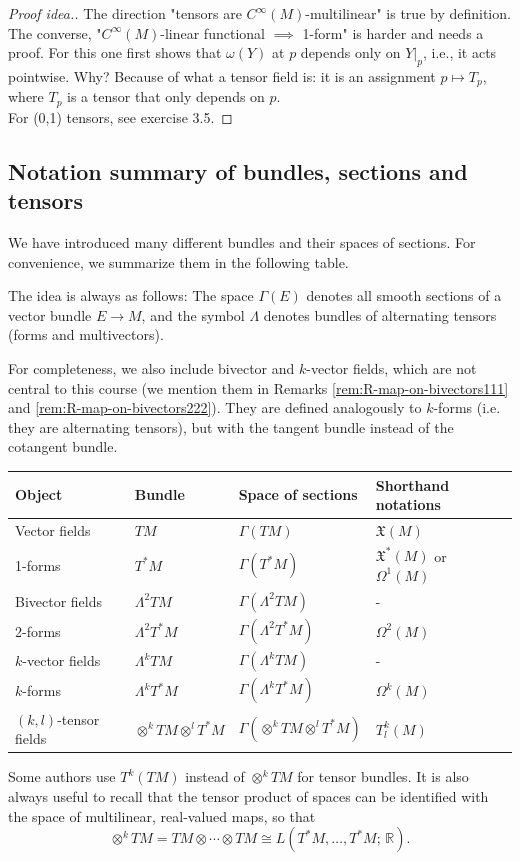 \begin{proof}[Proof idea.]
The direction "tensors are $C^\infty(M)$-multilinear" is true by definition. The converse, "$C^\infty(M)$-linear functional $\implies$ 1-form" is harder and needs a proof. For this one first shows that $\omega(Y)$ at $p$ depends only on $Y|_p$, i.e., it acts pointwise. Why? Because of what a tensor field is: it is an assignment $p\mapsto T_p$, where $T_p$ is a tensor that only depends on $p$.\\

For (0,1) tensors, see exercise 3.5.
\end{proof}



\subsection{Notation summary of bundles, sections and tensors}
\label{sec:notation-tensors}
We have introduced many different bundles and their spaces of sections. For convenience, we summarize them in the following table.

The idea is always as follows: The space $\Gamma(E)$ denotes all smooth sections of a vector bundle $E \to M$, and the symbol $\Lambda$ denotes bundles of alternating tensors (forms and multivectors). 

For completeness, we also include bivector and $k$-vector fields, which are not central to this course (we mention them in Remarks \ref{rem:R-map-on-bivectors111} and \ref{rem:R-map-on-bivectors222}). They are defined analogously to $k$-forms (i.e. they are alternating tensors), but with the tangent bundle instead of the cotangent bundle.\\

\begin{center}
\begin{tabular}{llll}
Object & Bundle & Space of sections & Shorthand notations\\
\hline
Vector fields & $TM$ & $\Gamma(TM)$ & $\mathfrak{X}(M)$ \\
1-forms & $T^*M$ & $\Gamma(T^*M)$ & $\mathfrak{X}^*(M)$ or $\Omega^1(M)$ \\
Bivector fields & $\Lambda^2 TM$ & $\Gamma(\Lambda^2 TM)$ & -\\
2-forms & $\Lambda^2 T^*M$ & $\Gamma(\Lambda^2 T^*M)$ & $\Omega^2(M)$ \\
$k$-vector fields & $\Lambda^k TM$ & $\Gamma(\Lambda^k TM)$ & -\\
$k$-forms & $\Lambda^k T^*M$ & $\Gamma(\Lambda^k T^*M)$ & $\Omega^k(M)$ \\
$(k, l)$-tensor fields & $\otimes^k TM \otimes^l T^*M$ & $\Gamma(\otimes^k TM \otimes^l T^*M)$ & $T^{k}_{l}(M)$\\
\end{tabular}
\end{center}

Some authors use $T^k(TM)$ instead of $\otimes^k TM$ for tensor bundles. It is also always useful to recall that the tensor product of spaces can be identified with the space of multilinear, real-valued maps, so that
\[
\otimes^k TM = TM\otimes\cdots\otimes TM \cong L(T^*M, \ldots, T^*M;\, \mathbb{R}).
\]